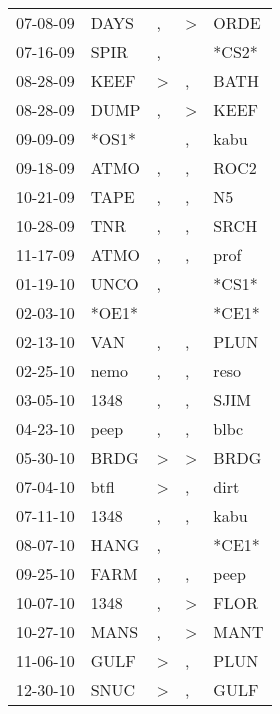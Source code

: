\begin{supertabular}{lllll}
 07-08-09 &   DAYS &                , &     \textgreater &   ORDE \\
 07-16-09 &   SPIR &                , &                  &  *CS2* \\
 08-28-09 &   KEEF &     \textgreater &                , &   BATH \\
 08-28-09 &   DUMP &                , &     \textgreater &   KEEF \\
 09-09-09 &  *OS1* &                  &                , &   kabu \\
 09-18-09 &   ATMO &                , &                , &   ROC2 \\
 10-21-09 &   TAPE &                , &                , &     N5 \\
 10-28-09 &    TNR &                , &                , &   SRCH \\
 11-17-09 &   ATMO &                , &                , &   prof \\
 01-19-10 &   UNCO &                , &                  &  *CS1* \\
 02-03-10 &  *OE1* &                  &                  &  *CE1* \\
 02-13-10 &    VAN &                , &                , &   PLUN \\
 02-25-10 &   nemo &                , &                , &   reso \\
 03-05-10 &   1348 &                , &                , &   SJIM \\
 04-23-10 &   peep &                , &                , &   blbc \\
 05-30-10 &   BRDG &     \textgreater &     \textgreater &   BRDG \\
 07-04-10 &   btfl &     \textgreater &                , &   dirt \\
 07-11-10 &   1348 &                , &                , &   kabu \\
 08-07-10 &   HANG &                , &                  &  *CE1* \\
 09-25-10 &   FARM &                , &                , &   peep \\
 10-07-10 &   1348 &                , &     \textgreater &   FLOR \\
 10-27-10 &   MANS &                , &     \textgreater &   MANT \\
 11-06-10 &   GULF &     \textgreater &                , &   PLUN \\
 12-30-10 &   SNUC &     \textgreater &                , &   GULF \\

\end{supertabular}
